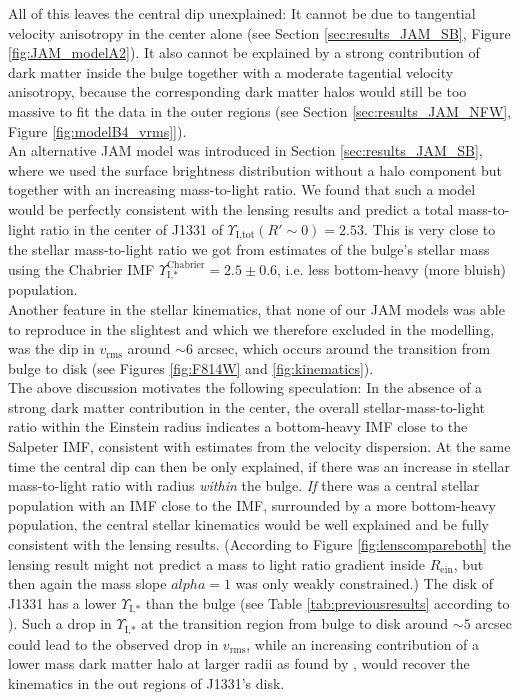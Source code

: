 All of this leaves the central dip unexplained: It cannot be due to tangential velocity anisotropy in the center alone (see Section \ref{sec:results_JAM_SB}, Figure \ref{fig:JAM_modelA2}). It also cannot be explained by a strong contribution of dark matter inside the bulge together with a moderate tagential velocity anisotropy, because the corresponding dark matter halos would still be too massive to fit the data in the outer regions (see Section \ref{sec:results_JAM_NFW}, Figure \ref{fig:modelB4_vrms}]).\\

An alternative JAM model was introduced in Section \ref{sec:results_JAM_SB}, where we used the surface brightness distribution without a halo component but together with an increasing mass-to-light ratio. We found that such a model would be perfectly consistent with the lensing results and predict a total mass-to-light ratio in the center of J1331 of  $\Upsilon_\text{I,tot}(R'\sim0) = 2.53$. This is very close to the stellar mass-to-light ratio we got from \citet{SWELLSI} estimates of the bulge's stellar mass using the Chabrier IMF $\Upsilon_\text{I,*}^\text{Chabrier} = 2.5 \pm 0.6$, i.e. less bottom-heavy (more bluish) population.\\

Another feature in the stellar kinematics, that none of our JAM models was able to reproduce in the slightest and which we therefore excluded in the modelling, was the dip in $v_\text{rms}$ around $\sim 6$ arcsec, which occurs around the transition from bulge to disk (see Figures \ref{fig:F814W} and \ref{fig:kinematics}).\\

The above discussion motivates the following speculation: In the absence of a strong dark matter contribution in the center, the overall stellar-mass-to-light ratio within the Einstein radius indicates a bottom-heavy IMF close to the Salpeter IMF, consistent with estimates from the velocity dispersion. At the same time the central dip can then be only explained, if there was an increase in stellar mass-to-light ratio with radius \textit{within} the bulge. \emph{If} there was a central stellar population with an IMF close to the \citet{Chabrier2003} IMF, surrounded by a more bottom-heavy population, the central stellar kinematics would be well explained and be fully consistent with the lensing results. (According to Figure \ref{fig:lenscompareboth} the lensing result might not predict a mass to light ratio gradient inside $R_\text{ein}$, but then again the mass slope $alpha=1$ was only weakly constrained.) The disk of J1331 has a lower $\Upsilon_\text{I,*}$ than the bulge (see Table \ref{tab:previousresults} according to \citet{SWELLSI}). Such a drop in $\Upsilon_\text{I,*}$ at the transition region from bulge to disk around $\sim 5$ arcsec could lead to the observed drop in $v_\text{rms}$, while an increasing contribution of a lower mass dark matter halo at larger radii as found by \citet{SWELLSV}, would recover the kinematics in the out regions of J1331's disk.\\

